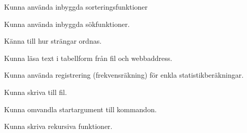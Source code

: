 

\Lab{\LabWeekTEN}

\begin{Goals}
\item Kunna använda inbyggda sorteringsfunktioner
\item Kunna använda inbyggda sökfunktioner.
\item Känna till hur strängar ordnas.
\item Kunna läsa text i tabellform från fil och webbaddress.
\item Kunna använda registrering (frekvensräkning) för enkla statistikberäkningar.
\item Kunna skriva till fil.
\item Kunna omvandla startargument till kommandon.
\item Kunna skriva rekursiva funktioner.
\end{Goals}


